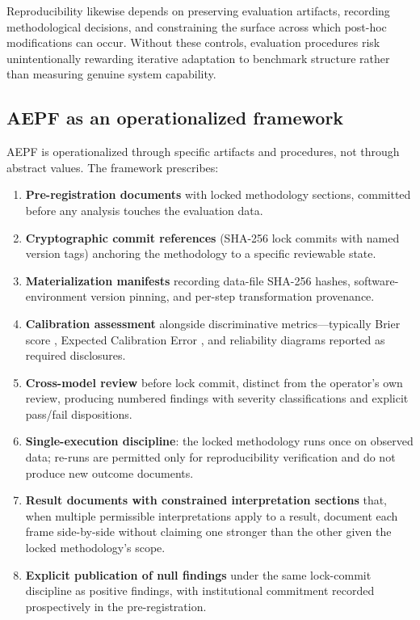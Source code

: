 \documentclass[11pt]{article}
\begin{document}
Reproducibility likewise depends on preserving evaluation artifacts,
recording methodological decisions, and constraining the surface
across which post-hoc modifications can occur. Without these
controls, evaluation procedures risk unintentionally rewarding
iterative adaptation to benchmark structure rather than measuring
genuine system capability.

\subsection{AEPF as an operationalized framework}
\label{subsec:aepf-overview}

AEPF is operationalized through specific artifacts and procedures,
not through abstract values. The framework prescribes:

\begin{enumerate}
  \item \textbf{Pre-registration documents} with locked methodology
    sections, committed before any analysis touches the evaluation
    data.
  \item \textbf{Cryptographic commit references} (SHA-256 lock
    commits with named version tags) anchoring the methodology to
    a specific reviewable state.
  \item \textbf{Materialization manifests} recording data-file
    SHA-256 hashes, software-environment version pinning, and
    per-step transformation provenance.
  \item \textbf{Calibration assessment} alongside discriminative
    metrics---typically Brier score \cite{brier1950}, Expected
    Calibration Error \cite{naeini2015ece}, and reliability diagrams
    reported as required disclosures.
  \item \textbf{Cross-model review} before lock commit, distinct
    from the operator's own review, producing numbered findings
    with severity classifications and explicit pass/fail
    dispositions.
  \item \textbf{Single-execution discipline}: the locked methodology
    runs once on observed data; re-runs are permitted only for
    reproducibility verification and do not produce new outcome
    documents.
  \item \textbf{Result documents with constrained interpretation
    sections} that, when multiple permissible interpretations apply
    to a result, document each frame side-by-side without claiming
    one stronger than the other given the locked methodology's
    scope.
  \item \textbf{Explicit publication of null findings} under the
    same lock-commit discipline as positive findings, with
    institutional commitment recorded prospectively in the
    pre-registration.
\end{enumerate}
\end{document}
